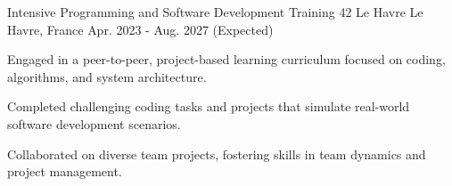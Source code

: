 

\begin{cventries}

  \cventry
    {Intensive Programming and Software Development Training} %
    {42 Le Havre} %
    {Le Havre, France} %
    {Apr. 2023 - Aug. 2027 (Expected)} %
    {
      \begin{cvitems} %
        \item {Engaged in a peer-to-peer, project-based learning curriculum focused on coding, algorithms, and system architecture.}
        \item {Completed challenging coding tasks and projects that simulate real-world software development scenarios.}
        \item {Collaborated on diverse team projects, fostering skills in team dynamics and project management.}
      \end{cvitems}
    }

\end{cventries}